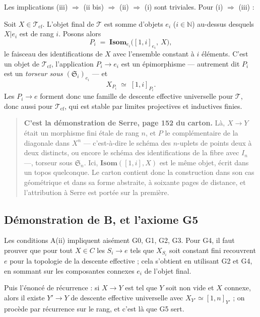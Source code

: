 \documentclass[11pt,a4paper]{article}
\begin{document}
Les implications (iii) $\Rightarrow$ (ii bis) $\Rightarrow$ (ii) $\Rightarrow$
(i) sont triviales. Pour (i) $\Rightarrow$ (iii) :

Soit $X \in \mathcal{T}_{\mathrm{cf}}$. L'objet final de $\mathcal{T}$ est somme
d'objets $e_{i}$ ($i \in \mathbb{N}$) au-dessus desquels $X|e_{i}$ est de rang
$i$. Posons alors
\[
  P_{i} \;=\; \mathbf{Isom}_{e_{i}}\bigl([1,i]_{e_{i}},\ X\bigr) ,
\]
le faisceau des identifications de $X$ avec l'ensemble constant à $i$ éléments.
C'est un objet de $\mathcal{T}_{\mathrm{cf}}$, l'application
$P_{i} \to e_{i}$ est un épimorphisme --- autrement dit $P_{i}$ est un
\emph{torseur sous $(\mathfrak{S}_{i})_{e_{i}}$} --- et
\[
  X_{P_{i}} \;\simeq\; [1, i]_{P_{i}} .
\]
Les $P_{i} \to e$ forment donc une famille de descente effective universelle
pour $\mathcal{T}$, donc aussi pour $\mathcal{T}_{\mathrm{cf}}$, qui est stable
par limites projectives et inductives finies.

\begin{quote}
\textbf{C'est la démonstration de Serre, page 152 du carton.} Là, $X \to Y$
était un morphisme fini étale de rang $n$, et $P$ le complémentaire de la
diagonale dans $X^{n}$ --- c'est-à-dire le schéma des $n$-uplets de points deux
à deux distincts, ou encore le schéma des identifications de la fibre avec
$I_{n}$ ---, torseur sous $\mathfrak{S}_{n}$. Ici, $\mathbf{Isom}([1,i], X)$
est le même objet, écrit dans un topos quelconque. Le carton contient donc la
construction dans son cas géométrique et dans sa forme abstraite, à
soixante pages de distance, et l'attribution à Serre est portée sur la
première.
\end{quote}

\subsection*{Démonstration de B, et l'axiome G5}

Les conditions A(ii) impliquent aisément G0, G1, G2, G3. Pour G4, il faut
prouver que pour tout $X \in C$ les $S_{i} \to e$ tels que $X_{S_{i}}$ soit
constant fini recouvrent $e$ pour la topologie de la descente effective ;
cela s'obtient en utilisant G2 et G4, en sommant sur les composantes connexes
$e_{i}$ de l'objet final.

Puis l'énoncé de récurrence : si $X \to Y$ est tel que $Y$ soit non vide et $X$
connexe, alors il existe $Y' \to Y$ de descente effective universelle avec
$X_{Y'} \simeq [1,n]_{Y'}$ ; on procède par récurrence sur le rang, et c'est
là que G5 sert.
\end{document}
